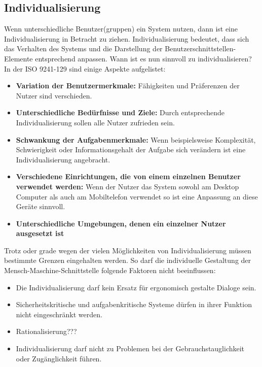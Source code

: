 \subsection{Individualisierung}
\label{2:Individualisierung}
Wenn unterschiedliche Benutzer(gruppen) ein System nutzen, dann ist eine Individualisierung in Betracht zu ziehen. Individualisierung bedeutet, dass sich das Verhalten des Systems und die Darstellung der Benutzerschnittstellen-Elemente entsprechend anpassen. Wann ist es nun sinnvoll zu individualisieren? In der ISO 9241-129 \cite{ISO9241-129} sind einige Aspekte aufgelistet:
\begin{itemize}
\item \textbf{Variation der Benutzermerkmale:} Fähigkeiten und Präferenzen der Nutzer sind verschieden.
\item \textbf{Unterschiedliche Bedürfnisse und Ziele:} Durch entsprechende Individualisierung sollen alle Nutzer zufrieden sein.
\item \textbf{Schwankung der Aufgabenmerkmale:} Wenn beispielsweise Komplexität, Schwierigkeit oder Informationsgehalt der Aufgabe sich verändern ist eine Individualisierung angebracht.
\item \textbf{Verschiedene Einrichtungen, die von einem einzelnen Benutzer verwendet werden:} Wenn der Nutzer das System sowohl am Desktop Computer als auch am Mobiltelefon verwendet so ist eine Anpassung an diese Geräte sinnvoll.
\item \textbf{Unterschiedliche Umgebungen, denen ein einzelner Nutzer ausgesetzt ist}
\end{itemize}
Trotz oder grade wegen der vielen Möglichkeiten von Individualisierung müssen bestimmte Grenzen eingehalten werden. So darf die individuelle Gestaltung der Mensch-Maschine-Schnittstelle folgende Faktoren nicht beeinflussen:
\begin{itemize}
\item Die Individualisierung darf kein Ersatz für ergonomisch gestalte Dialoge sein.
\item Sicherheitskritische und aufgabenkritische Systeme dürfen in ihrer Funktion nicht eingeschränkt werden.
\item Rationalisierung???
\item Individualisierung darf nicht zu Problemen bei der Gebrauchstauglichkeit oder Zugänglichkeit führen.
\end{itemize}

